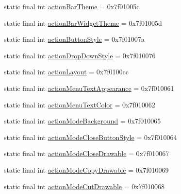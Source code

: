 \begin{CompactItemize}
\item 
static final int \hyperlink{classandroid_1_1support_1_1graphics_1_1drawable_1_1animated_1_1_r_1_1attr_ede30ab3af03eaa39f82d31e90089279}{actionBarTheme} = 0x7f01005c
\item 
static final int \hyperlink{classandroid_1_1support_1_1graphics_1_1drawable_1_1animated_1_1_r_1_1attr_148669f6b45b8d19a8c573d436e7a10e}{actionBarWidgetTheme} = 0x7f01005d
\item 
static final int \hyperlink{classandroid_1_1support_1_1graphics_1_1drawable_1_1animated_1_1_r_1_1attr_7968ce287335e8d9b72e8daaa40e6f08}{actionButtonStyle} = 0x7f01007a
\item 
static final int \hyperlink{classandroid_1_1support_1_1graphics_1_1drawable_1_1animated_1_1_r_1_1attr_8be6b3ea70e85b4ac9b07da29482abe2}{actionDropDownStyle} = 0x7f010076
\item 
static final int \hyperlink{classandroid_1_1support_1_1graphics_1_1drawable_1_1animated_1_1_r_1_1attr_e35ec3867fa8adb8e262d33b66b30d8c}{actionLayout} = 0x7f0100cc
\item 
static final int \hyperlink{classandroid_1_1support_1_1graphics_1_1drawable_1_1animated_1_1_r_1_1attr_1e7d6405f2b17e192a57b3df30209221}{actionMenuTextAppearance} = 0x7f010061
\item 
static final int \hyperlink{classandroid_1_1support_1_1graphics_1_1drawable_1_1animated_1_1_r_1_1attr_a1935234dedcbb37fc7d9ec40fdd7781}{actionMenuTextColor} = 0x7f010062
\item 
static final int \hyperlink{classandroid_1_1support_1_1graphics_1_1drawable_1_1animated_1_1_r_1_1attr_5f34120e3163efffe2a36712f0cd9b22}{actionModeBackground} = 0x7f010065
\item 
static final int \hyperlink{classandroid_1_1support_1_1graphics_1_1drawable_1_1animated_1_1_r_1_1attr_89c29e9c8e22997992257e125730bd33}{actionModeCloseButtonStyle} = 0x7f010064
\item 
static final int \hyperlink{classandroid_1_1support_1_1graphics_1_1drawable_1_1animated_1_1_r_1_1attr_a1e5d987ff89637fcf6eeb8dc354b5d1}{actionModeCloseDrawable} = 0x7f010067
\item 
static final int \hyperlink{classandroid_1_1support_1_1graphics_1_1drawable_1_1animated_1_1_r_1_1attr_d90a54dfaa4545d822b4109260a938e6}{actionModeCopyDrawable} = 0x7f010069
\item 
static final int \hyperlink{classandroid_1_1support_1_1graphics_1_1drawable_1_1animated_1_1_r_1_1attr_7aec173b8166feebd130eaba79c97d4f}{actionModeCutDrawable} = 0x7f010068

\end{CompactItemize}
